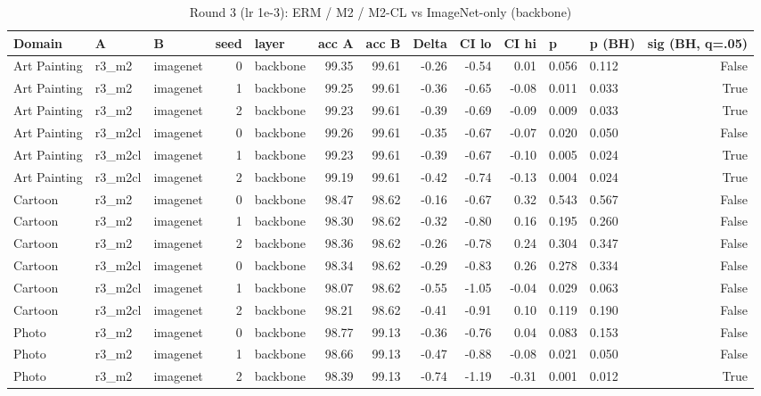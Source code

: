\begin{table}
\caption{Round 3 (lr 1e-3): ERM / M2 / M2-CL vs ImageNet-only (backbone)}
\label{tab:leak_r3_vs_imagenet}
\begin{tabular}{lllrlrrrrrllr}
\toprule
Domain & A & B & seed & layer & acc A & acc B & Delta & CI lo & CI hi & p & p (BH) & sig (BH, q=.05) \\
\midrule
Art Painting & r3\_m2 & imagenet & 0 & backbone & 99.35 & 99.61 & -0.26 & -0.54 & 0.01 & 0.056 & 0.112 & False \\
Art Painting & r3\_m2 & imagenet & 1 & backbone & 99.25 & 99.61 & -0.36 & -0.65 & -0.08 & 0.011 & 0.033 & True \\
Art Painting & r3\_m2 & imagenet & 2 & backbone & 99.23 & 99.61 & -0.39 & -0.69 & -0.09 & 0.009 & 0.033 & True \\
Art Painting & r3\_m2cl & imagenet & 0 & backbone & 99.26 & 99.61 & -0.35 & -0.67 & -0.07 & 0.020 & 0.050 & False \\
Art Painting & r3\_m2cl & imagenet & 1 & backbone & 99.23 & 99.61 & -0.39 & -0.67 & -0.10 & 0.005 & 0.024 & True \\
Art Painting & r3\_m2cl & imagenet & 2 & backbone & 99.19 & 99.61 & -0.42 & -0.74 & -0.13 & 0.004 & 0.024 & True \\
Cartoon & r3\_m2 & imagenet & 0 & backbone & 98.47 & 98.62 & -0.16 & -0.67 & 0.32 & 0.543 & 0.567 & False \\
Cartoon & r3\_m2 & imagenet & 1 & backbone & 98.30 & 98.62 & -0.32 & -0.80 & 0.16 & 0.195 & 0.260 & False \\
Cartoon & r3\_m2 & imagenet & 2 & backbone & 98.36 & 98.62 & -0.26 & -0.78 & 0.24 & 0.304 & 0.347 & False \\
Cartoon & r3\_m2cl & imagenet & 0 & backbone & 98.34 & 98.62 & -0.29 & -0.83 & 0.26 & 0.278 & 0.334 & False \\
Cartoon & r3\_m2cl & imagenet & 1 & backbone & 98.07 & 98.62 & -0.55 & -1.05 & -0.04 & 0.029 & 0.063 & False \\
Cartoon & r3\_m2cl & imagenet & 2 & backbone & 98.21 & 98.62 & -0.41 & -0.91 & 0.10 & 0.119 & 0.190 & False \\
Photo & r3\_m2 & imagenet & 0 & backbone & 98.77 & 99.13 & -0.36 & -0.76 & 0.04 & 0.083 & 0.153 & False \\
Photo & r3\_m2 & imagenet & 1 & backbone & 98.66 & 99.13 & -0.47 & -0.88 & -0.08 & 0.021 & 0.050 & False \\
Photo & r3\_m2 & imagenet & 2 & backbone & 98.39 & 99.13 & -0.74 & -1.19 & -0.31 & 0.001 & 0.012 & True \\

\end{tabular}
\end{table}
